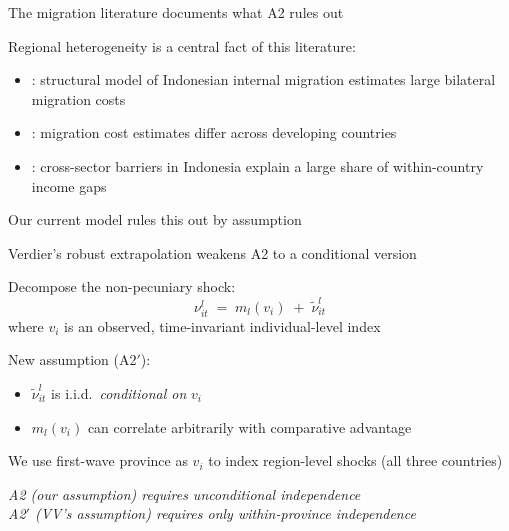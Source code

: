 \documentclass[10pt,aspectratio=169]{beamer}
\newcommand{\vii}{v_{i}}
\newcommand{\nuil}{\nu_{it}^{l}}
\newcommand{\tildenu}{\tilde{\nu}_{it}^{l}}
\begin{document}
\begin{frame}{The migration literature documents what A2 rules out}

  Regional heterogeneity is a central fact of this literature:

  \vspace{0.6em}
  \begin{itemize}
    \item \citet{bryanAggregateProductivityEffects2019}: structural model of Indonesian internal migration estimates large bilateral migration costs
    \item \citet{lagakosMigrationCostsObservational2020}: migration cost estimates differ across developing countries
    \item \citet{pulidoBarriersMobilitySorting2021}: cross-sector barriers in Indonesia explain a large share of within-country income gaps
  \end{itemize}

  \vspace{0.6em}
  Our current model rules this out by assumption

\end{frame}

\begin{frame}{Verdier's robust extrapolation weakens A2 to a conditional version}

  Decompose the non-pecuniary shock:
  \[
    \nuil \;=\; m_{l}(\vii) \;+\; \tildenu
  \]
  where $\vii$ is an observed, time-invariant individual-level index

  \vspace{0.6em}
  New assumption (A2$'$):
  \begin{itemize}
    \item $\tildenu$ is i.i.d.\ \emph{conditional on} $\vii$
    \item $m_{l}(\vii)$ can correlate arbitrarily with comparative advantage
  \end{itemize}

  \vspace{0.6em}
  We use first-wave province as $\vii$ to index region-level shocks (all three countries)

  \vspace{0.6em}
  \textit{A2 (our assumption) requires unconditional independence} \\
  \textit{A2$'$ (VV's assumption) requires only within-province independence}

\end{frame}
\end{document}

